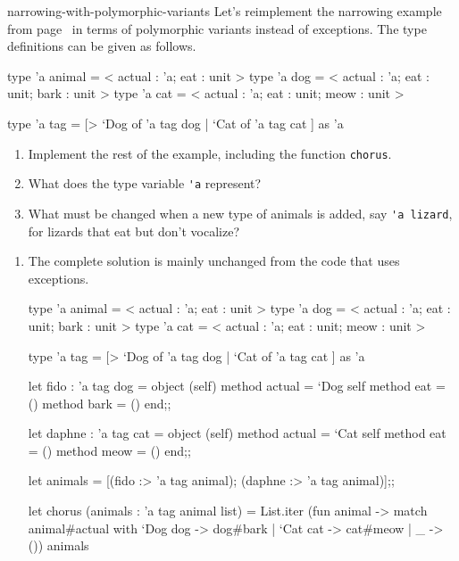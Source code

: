 %
\begin{exercise}{narrowing-with-polymorphic-variants}
Let's reimplement the narrowing example from page~\pageref{page:narrowing-with-exceptions} in terms of
polymorphic variants instead of exceptions.  The type definitions can be given as follows.

\begin{ocaml}
type 'a animal = < actual : 'a; eat : unit >
type 'a dog = < actual : 'a; eat : unit; bark : unit >
type 'a cat = < actual : 'a; eat : unit; meow : unit >

type 'a tag = [> `Dog of 'a tag dog | `Cat of 'a tag cat ] as 'a
\end{ocaml}
%
\begin{enumerate}
\item Implement the rest of the example, including the function \hbox{\lstinline/chorus/}.
\item What does the type variable \hbox{\lstinline/'a/} represent?
\item What must be changed when a new type of animals is added, say \hbox{\lstinline/'a lizard/},
for lizards that eat but don't vocalize?
\end{enumerate}

\begin{answer}\ifanswers
\begin{enumerate}
\item
The complete solution is mainly unchanged from the code that uses exceptions.

\begin{ocaml}
type 'a animal = < actual : 'a; eat : unit >
type 'a dog = < actual : 'a; eat : unit; bark : unit >
type 'a cat = < actual : 'a; eat : unit; meow : unit >

type 'a tag = [> `Dog of 'a tag dog | `Cat of 'a tag cat ] as 'a

let fido : 'a tag dog =
object (self)
   method actual = `Dog self
   method eat = ()
   method bark = ()
end;;

let daphne : 'a tag cat =
object (self)
   method actual = `Cat self
   method eat = ()
   method meow = ()
end;;

let animals = [(fido :> 'a tag animal); (daphne :> 'a tag animal)];;

let chorus (animals : 'a tag animal list) =
   List.iter (fun animal ->
      match animal#actual with
         `Dog dog -> dog#bark
       | `Cat cat -> cat#meow
       | _ -> ()) animals
\end{ocaml}


\end{enumerate}
\end{answer}
\end{exercise}
